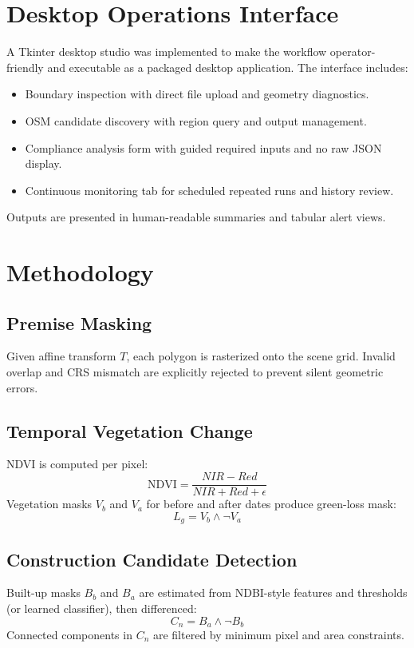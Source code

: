 \documentclass[conference]{IEEEtran}
\begin{document}
\section{Desktop Operations Interface}
A Tkinter desktop studio was implemented to make the workflow operator-friendly and executable as a packaged desktop application. The interface includes:
\begin{itemize}
    \item Boundary inspection with direct file upload and geometry diagnostics.
    \item OSM candidate discovery with region query and output management.
    \item Compliance analysis form with guided required inputs and no raw JSON display.
    \item Continuous monitoring tab for scheduled repeated runs and history review.
\end{itemize}
Outputs are presented in human-readable summaries and tabular alert views.

\section{Methodology}
\subsection{Premise Masking}
Given affine transform $T$, each polygon is rasterized onto the scene grid. Invalid overlap and CRS mismatch are explicitly rejected to prevent silent geometric errors.

\subsection{Temporal Vegetation Change}
NDVI is computed per pixel:
\begin{equation}
\mathrm{NDVI} = \frac{NIR - Red}{NIR + Red + \epsilon}
\end{equation}
Vegetation masks $V_b$ and $V_a$ for before and after dates produce green-loss mask:
\begin{equation}
L_g = V_b \land \neg V_a
\end{equation}

\subsection{Construction Candidate Detection}
Built-up masks $B_b$ and $B_a$ are estimated from NDBI-style features and thresholds (or learned classifier), then differenced:
\begin{equation}
C_n = B_a \land \neg B_b
\end{equation}
Connected components in $C_n$ are filtered by minimum pixel and area constraints.
\end{document}
